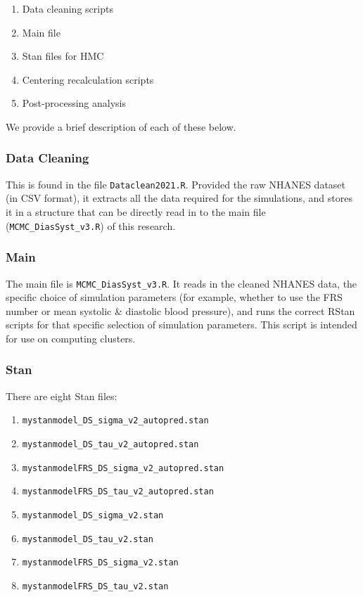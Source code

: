 \documentclass[
]{article}
\providecommand{\tightlist}{%
  \setlength{\itemsep}{0pt}\setlength{\parskip}{0pt}}
\begin{document}
\begin{enumerate}
\def\labelenumi{\arabic{enumi}.}
\tightlist
\item
  Data cleaning scripts
\item
  Main file
\item
  Stan files for HMC
\item
  Centering recalculation scripts
\item
  Post-processing analysis
\end{enumerate}

We provide a brief description of each of these below.

\hypertarget{data-cleaning}{%
\subsubsection{Data Cleaning}\label{data-cleaning}}

This is found in the file \texttt{Dataclean2021.R}. Provided the raw NHANES dataset (in CSV format), it extracts all the data required for the simulations, and stores it in a structure that can be directly read in to the main file (\texttt{MCMC\_DiasSyst\_v3.R}) of this research.

\hypertarget{main}{%
\subsubsection{Main}\label{main}}

The main file is \texttt{MCMC\_DiasSyst\_v3.R}. It reads in the cleaned NHANES data, the specific choice of simulation parameters (for example, whether to use the FRS number or mean systolic \& diastolic blood pressure), and runs the correct RStan scripts for that specific selection of simulation parameters. This script is intended for use on computing clusters.

\hypertarget{stan}{%
\subsubsection{Stan}\label{stan}}

There are eight Stan files:

\begin{enumerate}
\def\labelenumi{\arabic{enumi}.}
\tightlist
\item
  \texttt{mystanmodel\_DS\_sigma\_v2\_autopred.stan}
\item
  \texttt{mystanmodel\_DS\_tau\_v2\_autopred.stan}
\item
  \texttt{mystanmodelFRS\_DS\_sigma\_v2\_autopred.stan}
\item
  \texttt{mystanmodelFRS\_DS\_tau\_v2\_autopred.stan}
\item
  \texttt{mystanmodel\_DS\_sigma\_v2.stan}
\item
  \texttt{mystanmodel\_DS\_tau\_v2.stan}
\item
  \texttt{mystanmodelFRS\_DS\_sigma\_v2.stan}
\item
  \texttt{mystanmodelFRS\_DS\_tau\_v2.stan}
\end{enumerate}
\end{document}
